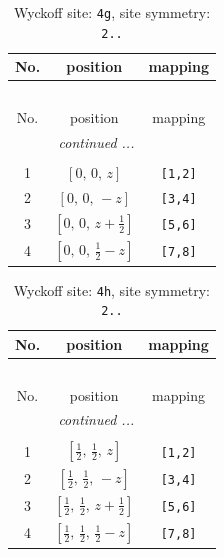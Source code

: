 \documentclass[fleqn,8pt]{jsarticle}
\begin{document}
\begin{longtable}{ccc}
\caption{Wyckoff site: {\tt 4g}, site symmetry: {\tt 2..}}
 \\
 \hline \hline
No. & position & mapping \\ \hline \endfirsthead

\multicolumn{2}{l}{\tablename\ \thetable{}} \\
 \hline \hline
No. & position & mapping \\ \hline \endhead

 \hline \hline
\multicolumn{2}{r}{\footnotesize\it continued ...} \\ \endfoot

 \hline \hline
\multicolumn{2}{r}{} \\ \endlastfoot

1 & $\left[ 0,\, 0,\, z \right]$ & {\tt [1,2]} \\ \hline
2 & $\left[ 0,\, 0,\, - z \right]$ & {\tt [3,4]} \\ \hline
3 & $\left[ 0,\, 0,\, z + \frac{1}{2} \right]$ & {\tt [5,6]} \\ \hline
4 & $\left[ 0,\, 0,\, \frac{1}{2} - z \right]$ & {\tt [7,8]} \\
\end{longtable}
\renewcommand{\arraystretch}{1.2}
\begin{longtable}{ccc}
\caption{Wyckoff site: {\tt 4h}, site symmetry: {\tt 2..}}
 \\
 \hline \hline
No. & position & mapping \\ \hline \endfirsthead

\multicolumn{2}{l}{\tablename\ \thetable{}} \\
 \hline \hline
No. & position & mapping \\ \hline \endhead

 \hline \hline
\multicolumn{2}{r}{\footnotesize\it continued ...} \\ \endfoot

 \hline \hline
\multicolumn{2}{r}{} \\ \endlastfoot

1 & $\left[ \frac{1}{2},\, \frac{1}{2},\, z \right]$ & {\tt [1,2]} \\ \hline
2 & $\left[ \frac{1}{2},\, \frac{1}{2},\, - z \right]$ & {\tt [3,4]} \\ \hline
3 & $\left[ \frac{1}{2},\, \frac{1}{2},\, z + \frac{1}{2} \right]$ & {\tt [5,6]} \\ \hline
4 & $\left[ \frac{1}{2},\, \frac{1}{2},\, \frac{1}{2} - z \right]$ & {\tt [7,8]} \\
\end{longtable}
\end{document}
